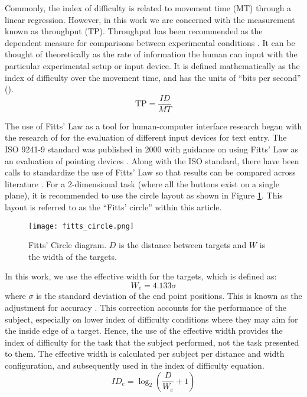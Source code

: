 Commonly, the index of difficulty is related to movement time ($\mathrm{MT}$) through a linear regression.
However, in this work we are concerned with the measurement known as throughput ($\mathrm{TP}$).
Throughput has been recommended as the dependent measure for comparisons between experimental conditions \citep{soukoreff_towards_2004}.
It can be thought of theoretically as the rate of information the human can input with the particular experimental setup or input device.
It is defined mathematically as the index of difficulty over the movement time, and has the units of ``bits per second'' (\si{\bps}).
\begin{equation}
    \mathrm{TP}=\frac{ID}{MT}
    \label{eq:throughput}
\end{equation}

The use of Fitts' Law as a tool for human-computer interface research began with the research of \citet{card_evaluation_1978} for the evaluation of different input devices for text entry.
The ISO 9241-9 standard was published in 2000 with guidance on using Fitts' Law as an evaluation of pointing devices \citep{international_organization_for_standardization_iso_2000}.
Along with the ISO standard, there have been calls to standardize the use of Fitts' Law so that results can be compared across literature \citep{soukoreff_towards_2004}.
For a 2-dimensional task (where all the buttons exist on a single plane), it is recommended to use the circle layout as shown in Figure \ref{fig:ph_fitts_circle}.
This layout is referred to as the ``Fitts' circle'' within this article.

\begin{figure}
    \centering
    \texttt{[image: fitts\_circle.png]}
    \caption{Fitts' Circle diagram. $D$ is the distance between targets and $W$ is the width of the targets.}
    \label{fig:ph_fitts_circle}
\end{figure}

In this work, we use the effective width for the targets, which is defined as:
\begin{equation}
    W_e = 4.133\sigma
\end{equation}
where $\sigma$ is the standard deviation of the end point positions.
This is known as the adjustment for accuracy \citep{welford_fundamentals_1968}.
This correction accounts for the performance of the subject, especially on lower index of difficulty conditions where they may aim for the inside edge of a target.
Hence, the use of the effective width provides the index of difficulty for the task that the subject performed, not the task presented to them.
The effective width is calculated per subject per distance and width configuration, and subsequently used in the index of difficulty equation.
\begin{equation}
    {ID}_e=\log_2\left(\frac{D}{W_e}+1\right)
\end{equation}

